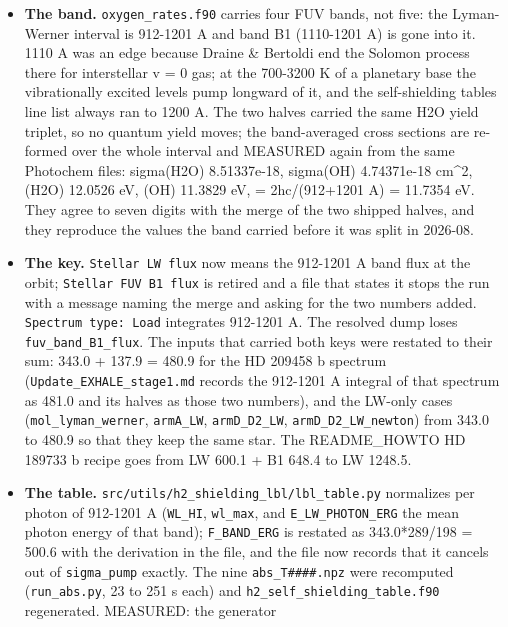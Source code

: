 \documentclass[english,a4paper]{my_memo}
\providecommand{\tightlist}{\setlength{\itemsep}{0pt}\setlength{\parskip}{0pt}}
\begin{document}
\begin{itemize}
  \begin{itemize}
  \tightlist
  \item
    \textbf{The band.} \texttt{oxygen\_rates.f90} carries four FUV bands, not five: the
    Lyman-Werner interval is 912-1201 A and band B1 (1110-1201 A) is gone
    into it. 1110 A was an edge because Draine \& Bertoldi end the Solomon
    process there for interstellar v = 0 gas; at the 700-3200 K of a
    planetary base the vibrationally excited levels pump longward of it, and
    the self-shielding table\textquotesingle s line list always ran to 1200 A. The two
    halves carried the same H2O yield triplet, so no quantum yield moves;
    the band-averaged cross sections are re-formed over the whole interval
    and MEASURED again from the same Photochem files: sigma(H2O)
    8.51337e-18, sigma(OH) 4.74371e-18 cm\^{}2, (H2O) 12.0526 eV, (OH)
    11.3829 eV, = 2hc/(912+1201 A) = 11.7354 eV. They agree to seven
    digits with the merge of the two shipped halves, and they reproduce the
    values the band carried before it was split in 2026-08.
  \item
    \textbf{The key.} \texttt{Stellar\ LW\ flux} now means the 912-1201 A band flux at the
    orbit; \texttt{Stellar\ FUV\ B1\ flux} is retired and a file that states it stops
    the run with a message naming the merge and asking for the two numbers
    added. \texttt{Spectrum\ type:\ Load} integrates 912-1201 A. The resolved dump
    loses \texttt{fuv\_band\_B1\_flux}. The inputs that carried both keys were
    restated to their sum: 343.0 + 137.9 = 480.9 for the HD 209458 b
    spectrum (\texttt{Update\_EXHALE\_stage1.md} records the 912-1201 A integral of
    that spectrum as 481.0 and its halves as those two numbers), and the
    LW-only cases (\texttt{mol\_lyman\_werner}, \texttt{armA\_LW}, \texttt{armD\_D2\_LW},
    \texttt{armD\_D2\_LW\_newton}) from 343.0 to 480.9 so that they keep the same
    star. The README\_HOWTO HD 189733 b recipe goes from LW 600.1 + B1 648.4
    to LW 1248.5.
  \item
    \textbf{The table.} \texttt{src/utils/h2\_shielding\_lbl/lbl\_table.py} normalizes per
    photon of 912-1201 A (\texttt{WL\_HI}, \texttt{wl\_max}, and \texttt{E\_LW\_PHOTON\_ERG} the mean
    photon energy of that band); \texttt{F\_BAND\_ERG} is restated as
    343.0*289/198 = 500.6 with the derivation in the file, and the file now
    records that it cancels out of \texttt{sigma\_pump} exactly. The nine
    \texttt{abs\_T\#\#\#\#.npz} were recomputed (\texttt{run\_abs.py}, 23 to 251 s each) and
    \texttt{h2\_self\_shielding\_table.f90} regenerated. MEASURED: the generator

\end{itemize}
\end{itemize}
\end{document}
